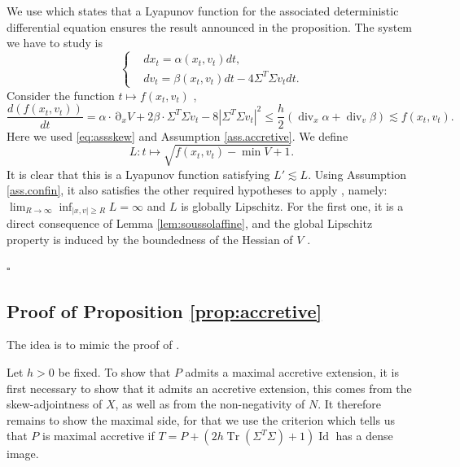 \documentclass[12pt]{amsart}
\newcommand{\Id}{\operatorname{Id}}
\newcommand{\Tr}{{\operatorname{Tr}}}
\renewcommand{\div}{\operatorname{div}}
\newcommand{\ep}{\hfill $\square$}
\numberwithin{equation}{section}
\numberwithin{figure}{section}
\DeclareMathOperator{\p}{\partial}
\begin{document}
We use \cite[Theorem 1.7]{Kh12} which states that a Lyapunov function for the associated deterministic differential equation ensures the result announced in the proposition. The system we have to study is
\begin{equation*}
\left\{
\begin{aligned}
&dx_t = \alpha(x_t,v_t)dt,\\
&dv_t = \beta(x_t,v_t)dt - 4\Sigma^T\Sigma v_tdt.
\end{aligned}
\right.
\end{equation*}
Consider the function $t\mapsto f(x_t,v_t)$%
,
\begin{equation*}
\frac{d(f(x_t,v_t))}{dt} = \alpha\cdot\p_xV + 2\beta\cdot\Sigma^T\Sigma v_t - 8|\Sigma^T\Sigma v_t|^2 \leq \frac h2 (\div_x\alpha + \div_v\beta) \lesssim f(x_t,v_t).
\end{equation*}
Here %
we used \eqref{eq:assskew} and Assumption \ref{ass.accretive}. We define
\begin{equation*}
L:t\mapsto\sqrt{f(x_t,v_t) - \min V + 1}.
\end{equation*}
It is clear that this is a Lyapunov function satisfying $L' \lesssim L$. Using Assumption \ref{ass.confin}, it also satisfies the other required hypotheses to apply \cite[Theorem 1.7]{Kh12}, namely: $\lim_{R\to\infty}\inf_{|x,v|\geq R}L = \infty$ and $L$ is globally Lipschitz. For the first one, it is a direct consequence of Lemma \ref{lem:soussolaffine}, and the global Lipschitz property is induced by the boundedness of the Hessian of $V$%
.

\ep










\subsection{Proof of Proposition \ref{prop:accretive}}\label{ssec:accretive}

The %
idea is to mimic the proof of \cite[Theorem 15.1]{He13}.

Let $h>0$ be fixed. To show that $P$ admits a maximal accretive extension, it is first necessary to show that it admits an accretive extension, this comes from the skew-adjointness of $X$, as well as from the non-negativity of $N$. It therefore remains to show the maximal side, for that we use the criterion which tells us that $P$ is maximal accretive if $T=P+(2h\Tr(\Sigma^T\Sigma)+1)\Id$ has a dense image.
\end{document}
